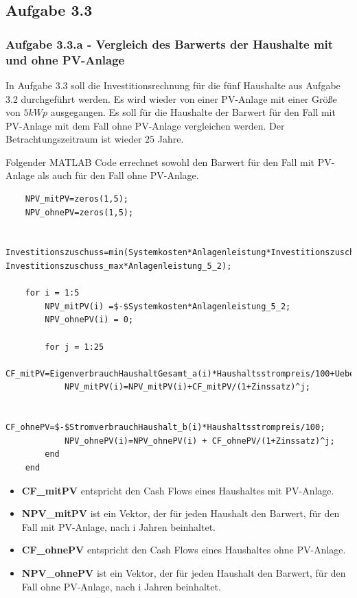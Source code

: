 \documentclass[a4paper,12pt]{article}
\begin{document}
	\subsection{Aufgabe 3.3}
	\subsubsection{Aufgabe 3.3.a - Vergleich des Barwerts der Haushalte mit und ohne PV-Anlage}
	In Aufgabe 3.3 soll die Investitionsrechnung für die fünf Haushalte aus Aufgabe 3.2 durchgeführt werden. Es wird wieder von einer PV-Anlage mit einer Größe von $5kWp$ ausgegangen.\newline
	Es soll für die Haushalte der Barwert für den Fall mit PV-Anlage mit dem Fall ohne PV-Anlage vergleichen werden. Der Betrachtungszeitraum ist wieder $25$ Jahre.\\ \par
	\noindent Folgender MATLAB Code errechnet sowohl den Barwert für den Fall mit PV-Anlage als auch für den Fall ohne PV-Anlage.
	\begin{lstlisting}
	NPV_mitPV=zeros(1,5);
	NPV_ohnePV=zeros(1,5);
	
	Investitionszuschuss=min(Systemkosten*Anlagenleistung*Investitionszuschuss_prozent, Investitionszuschuss_max*Anlagenleistung_5_2);
	
	for i = 1:5
		NPV_mitPV(i) =$-$Systemkosten*Anlagenleistung_5_2;
		NPV_ohnePV(i) = 0;

		for j = 1:25
			CF_mitPV=EigenverbrauchHaushaltGesamt_a(i)*Haushaltsstrompreis/100+UeberschussHaushalt_a(i)*Einspeisetarif_5_3/100+Investitionszuschuss$-$(StromverbrauchHaushalt_b(i)$-$EigenverbrauchHaushaltGesamt_a(i))*Haushaltsstrompreis/100$-$Betriebskosten*Anlagenleistung;
			NPV_mitPV(i)=NPV_mitPV(i)+CF_mitPV/(1+Zinssatz)^j;
			
			CF_ohnePV=$-$StromverbrauchHaushalt_b(i)*Haushaltsstrompreis/100;
			NPV_ohnePV(i)=NPV_ohnePV(i) + CF_ohnePV/(1+Zinssatz)^j;
		end
	end
	\end{lstlisting}
	\begin{itemize}
		\item \textbf{CF\_mitPV} entspricht den Cash Flows eines Haushaltes mit PV-Anlage.
		\item \textbf{NPV\_mitPV} ist ein Vektor, der für jeden Haushalt den Barwert, für den Fall mit PV-Anlage, nach i Jahren beinhaltet.
		\item \textbf{CF\_ohnePV} entspricht den Cash Flows eines Haushaltes ohne PV-Anlage.
		\item \textbf{NPV\_ohnePV} ist ein Vektor, der für jeden Haushalt den Barwert, für den Fall ohne PV-Anlage, nach i Jahren beinhaltet.
	\end{itemize}
\end{document}
